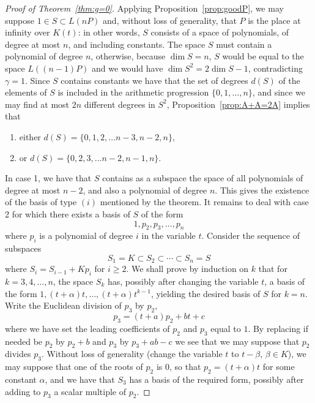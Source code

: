 \documentclass{article}
\theoremstyle{plain}
\theoremstyle{definition}
\theoremstyle{remark}
\renewcommand{\geq}{\geqslant}
\begin{document}
\begin{proof}[Proof of Theorem~\ref{thm:g=0}]
  Applying Proposition~\ref{prop:goodP}, we may suppose $1\in S\subset
  L(nP)$ and, without loss of generality, that $P$ is the place at
  infinity over $K(t)$: in other words, $S$ consists of a space of
  polynomials, of degree at most $n$, and including constants.
  The space $S$ must contain a polynomial of degree $n$, otherwise,
  because $\dim S=n$, $S$ would be equal to the space $L((n-1)P)$ and
  we would have $\dim S^2=2\dim S-1$, contradicting $\gamma=1$.
  Since $S$ contains constants we have that the set of degrees $d(S)$
  of the elements of $S$
  is included in the arithmetic progression $\{0,1,\ldots ,n\}$, and
  since we may find at most $2n$ different degrees in $S^2$,
  Proposition~\ref{prop:A+A=2A} implies that 
  \TabPositions{15mm}
  \begin{enumerate}
  \item either \tab $d(S)=\{0,1,2,\ldots n-3,n-2,n\}$,
  \item or    \tab $d(S)=\{0,2,3,\ldots n-2,n-1,n\}$.
  \end{enumerate}
  In case 1, we have that $S$ contains as a subspace the space of all
  polynomials of degree at most $n-2$, and also a polynomial of degree
  $n$. This gives the existence of the basis of type $(i)$ mentioned
  by the theorem. 
  It remains to deal with case 2 for which there exists a basis of $S$
  of the form 
  $$1,p_2,p_3,\ldots ,p_n$$
where $p_i$ is a polynomial of degree $i$ in the variable $t$.
Consider the sequence of subspaces 
$$S_1=K\subset S_2\subset\cdots
\subset S_n=S$$
where $S_i= S_{i-1}+Kp_i$ for $i\geq 2$.
We shall prove by induction on $k$ that for $k=3,4,\ldots ,n$, the space
$S_k$ has, possibly after changing the variable $t$, a basis of the
form $1,(t+\alpha)t,\ldots, (t+\alpha)t^{k-1}$, yielding the desired
basis of $S$ for $k=n$.
Write the Euclidean division of $p_3$ by $p_2$, 
$$p_3=(t+a)p_2 + bt+c$$
where we have set the leading coefficients of $p_2$ and $p_3$ equal to
$1$. By replacing if needed be $p_2$ by $p_2+b$ and $p_3$ by $p_3+ab-c$
we see that we may suppose that $p_2$ divides $p_3$. Without loss of
generality (change the variable $t$ to $t-\beta$, $\beta\in K$), we
may suppose that one of the roots of $p_2$ is $0$, so that
$p_2=(t+\alpha)t$ for some constant $\alpha$, and we have that $S_3$
has a basis of the required form, possibly after adding to $p_3$ a
scalar multiple of $p_2$.


\end{proof}
\end{document}
